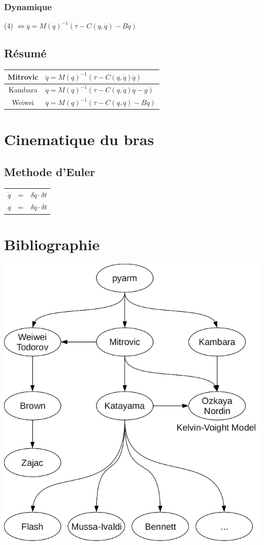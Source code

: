 \documentclass[pdftex,a4paper,11pt]{article}
\begin{document}
\subsubsection{Dynamique}
(4) $\Leftrightarrow \ddot{q} = M(q)^{-1} (\tau - C(q, \dot{q}) - B\dot{q}) $

\subsection{Résumé}
\begin{tabular}{|c|l|}
    \hline
    Mitrovic & $\ddot{q} = M(q)^{-1} (\tau - C(q, \dot{q}) \dot{q})$ \\
    \hline
    Kambara  & $\ddot{q} = M(q)^{-1} (\tau - C(q, \dot{q}) \dot{q} - g)$ \\
    \hline
    Weiwei   & $\ddot{q} = M(q)^{-1} (\tau - C(q, \dot{q}) - B\dot{q})$ \\
    \hline
\end{tabular}


\section{Cinematique du bras}

\subsection{Methode d'Euler}

\begin{tabular}{lcl}
    $\dot{q}$ & = & $\delta \ddot{q} \cdot \delta t$ \\
    $q$ & = & $\delta \dot{q} \cdot \delta t$ \\
\end{tabular}
    

\section{Bibliographie}

\begin{center}
        \includegraphics[width=.80\linewidth]{fig/bib}
\end{center}
\end{document}
